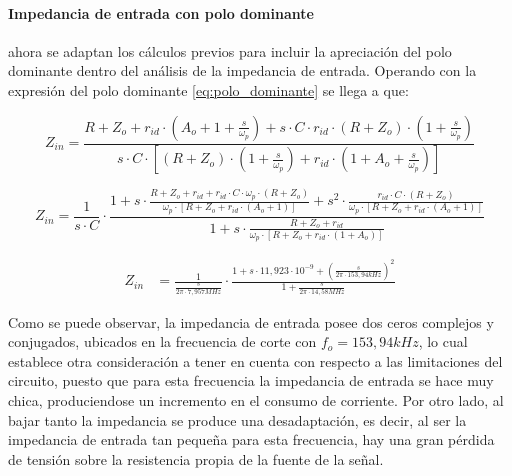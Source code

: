\paragraph*{Impedancia de entrada con polo dominante} ahora se adaptan los c\'alculos previos para incluir la apreciaci\'on del polo dominante dentro del an\'alisis de la impedancia de entrada. Operando con la expresi\'on del polo dominante \ref{eq:polo_dominante} se llega a que:

\begin{equation*}
	Z_{in} = \frac{R + Z_o + r_{id} \cdot (A_o + 1 + \frac{s}{\omega_p}) + s \cdot C \cdot r_{id} \cdot (R + Z_o) \cdot (1 + \frac{s}{\omega_p})}{s \cdot C \cdot \left[ (R + Z_o) \cdot (1 + \frac{s}{\omega_p}) + r_{id} \cdot (1 + A_o + \frac{s}{\omega_p}) \right]}
\end{equation*}

\begin{equation*}
	Z_{in} = \frac{1}{s \cdot C} \cdot 
	\frac{1 + s \cdot \frac{R + Z_o + r_{id} + r_{id} \cdot C \cdot \omega_p \cdot(R + Z_o)}{\omega_p \cdot \left[ R + Z_o + r_{id} \cdot (A_o + 1) \right]} + s^{2} \cdot \frac{r_{id} \cdot C \cdot (R + Z_o)}{\omega_p \cdot \left[ R + Z_o + r_{id} \cdot (A_o + 1) \right]}}{1 + s \cdot \frac{R + Z_o + r_{id}}{\omega_p \cdot \left[ R + Z_o + r_{id} \cdot (1 + A_o)\right]}}
\end{equation*}

\begin{align}
	Z_{in} & = \frac{1}{\frac{s}{2 \pi \cdot 7,957MHz}} \cdot
	\frac{1 + s \cdot 11,923 \cdot 10^{-9} + \left(\frac{s}{2 \pi \cdot 153,94kHz}\right)^{2}}{1 + \frac{s}{2 \pi \cdot 14,58MHz}}
	\label{eq:derivador_impedancia_polo_dominante}
\end{align}

Como se puede observar, la impedancia de entrada posee dos ceros complejos y conjugados, ubicados en la frecuencia de corte con $f_o = 153,94kHz$, lo cual establece otra consideración a tener en cuenta con respecto a las limitaciones del circuito, puesto que para esta frecuencia la impedancia de entrada se hace muy chica, produciendose un incremento en el consumo de corriente. Por otro lado, al bajar tanto la impedancia se produce una desadaptaci\'on, es decir, al ser la impedancia de entrada tan peque\~na para esta frecuencia, hay una gran p\'erdida de tensi\'on sobre la resistencia propia de la fuente de la se\~nal.

